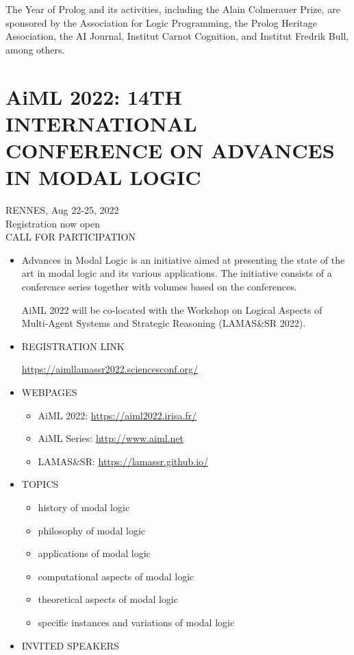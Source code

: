 \documentclass[prodmode,acmtecs]{acmsmall} %
\begin{document}
\begin{itemize}
  The Year of Prolog and its activities, including the Alain Colmerauer Prize, are sponsored by the Association for Logic Programming, the Prolog Heritage Association, the AI Journal, Institut Carnot Cognition, and Institut Fredrik Bull, among others. 
 
\end{itemize}\section{AiML 2022: 14TH INTERNATIONAL CONFERENCE ON ADVANCES IN MODAL LOGIC}\label{AiML2022}  RENNES, Aug 22-25, 2022\\ 
  Registration now open\\ 
CALL FOR PARTICIPATION 

\begin{itemize}\item  Advances in Modal Logic is an initiative aimed at presenting the state of the art in modal logic and its various applications. The initiative consists of a conference series together with volumes based on the conferences. 
 
  AiML 2022 will be co-located with the Workshop on Logical Aspects of Multi-Agent Systems and Strategic Reasoning (LAMAS\&SR 2022).  
 
\item  REGISTRATION LINK 
 
  \href{https://aimllamassr2022.sciencesconf.org/}{https://aimllamassr2022.sciencesconf.org/} 
 
\item  WEBPAGES   
 
\begin{itemize}\item  AiML 2022: \href{https://aiml2022.irisa.fr/}{https://aiml2022.irisa.fr/}
\item  AiML Series: \href{http://www.aiml.net}{http://www.aiml.net}
\item  LAMAS\&SR: \href{https://lamassr.github.io/}{https://lamassr.github.io/}
\end{itemize} 
\item  TOPICS   
 
\begin{itemize}\item  history of modal logic
\item  philosophy of modal logic
\item  applications of modal logic
\item  computational aspects of modal logic
\item  theoretical aspects of modal logic
\item  specific instances and variations of modal logic
\end{itemize} 
\item  INVITED SPEAKERS 
 

\end{itemize}
\end{document}
